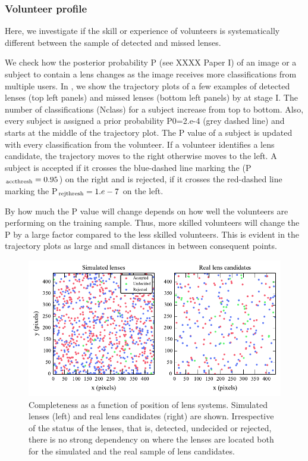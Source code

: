 \documentclass[useAMS,usenatbib,a4paper]{mn2e}
\begin{document}
\subsubsection{Volunteer profile}

Here, we investigate if the skill or experience of volunteers is
systematically different between the sample of detected and missed
lenses.

We check how the posterior probability P (see XXXX Paper I) of an image
or a subject to contain a lens changes as the image receives more
classifications from multiple users.  In , we show the
trajectory plots of a few examples of detected lenses (top left panels)
and missed lenses (bottom left panels) by \sw at stage I. The number of
classifications (Nclass) for a subject increase from top to bottom.
Also, every subject is assigned a prior probability P0=2.e-4 (grey
dashed line) and starts at the middle of the trajectory plot. The P
value of a subject is updated with every classification from the
volunteer.  If a volunteer identifies a lens candidate, the trajectory
moves to the right otherwise moves to the left. A subject is accepted if it
crosses the blue-dashed line marking the (P$_{\rm acc thresh}=0.95$) on
the right and is rejected, if it crosses the red-dashed line marking the
P$_{\rm rej thresh}=1.e-7$ on the left.

By how much the P value will change depends on how well the
volunteers are performing on the training sample. Thus, more skilled
volunteers will change the P by a large factor compared to the less
skilled volunteers. This is evident in the trajectory plots as large and
small distances in between consequent points.   


\begin{figure}
\begin{center}
\includegraphics[scale=0.95]{sw-cfhtls-figs/completeness_pos.pdf}
\caption{ \label{fig:comppos}
Completeness as a function of position of lens systems. Simulated lenses
(left) and real lens candidates (right) are shown. Irrespective of the
status of the lenses, that is, detected, undecided or rejected, there is
no strong dependency on where the lenses are located both for the
simulated and the real sample of lens candidates. }
\end{center}
\end{figure}
\end{document}
